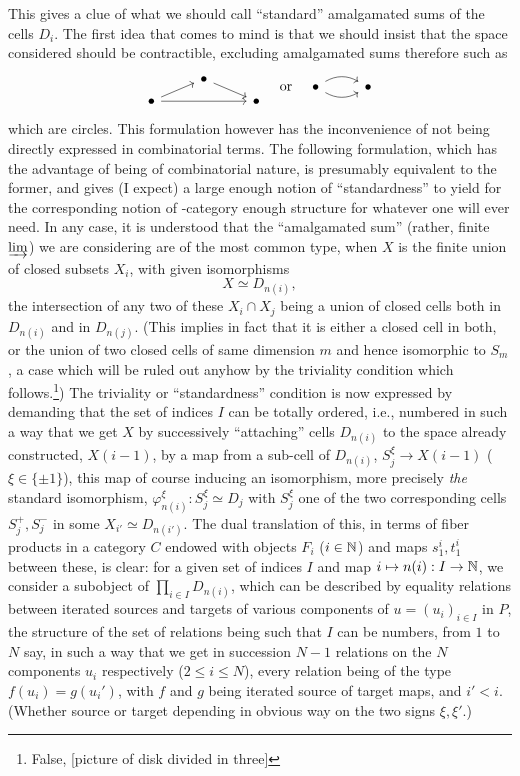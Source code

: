 This gives a clue of what we should call ``standard'' amalgamated sums
of the cells $D_i$. The first idea that comes to mind is that we
should insist that the space considered should be contractible,
excluding amalgamated sums therefore such as
\[
\begin{tikzcd}[row sep=tiny]
  & \bullet \ar[dr] \\ \bullet \ar[ur] \ar[rr] & & \bullet
\end{tikzcd} \quad\text{or}\quad
\begin{tikzcd}
  \bullet \ar[r, bend left] \ar[r, bend right] & \bullet
\end{tikzcd}\]
which are circles. This formulation however has the inconvenience of
not being directly expressed in combinatorial terms. The following
formulation, which has the advantage of being of combinatorial nature,
is presumably equivalent to the former, and gives (I expect) a large
enough notion of ``standardness'' to yield for the corresponding
notion of \oo-category enough structure for whatever one will ever
need. In any case, it is understood that the ``amalgamated
sum'' (rather, finite $\varinjlim$) we are considering are of the most
common type, when $X$ is the finite union of closed subsets $X_i$,
with given isomorphisms
\[ X \simeq D_{n(i)},\]
the intersection of any two of these $X_i\cap X_j$ being a union of
closed cells both in $D_{n(i)}$ and in $D_{n(j)}$. (This implies in
fact that it is either a closed cell in both, or the union of two
closed cells of same dimension $m$ and hence isomorphic to $S_m$, a
case which will be ruled out anyhow by the triviality condition which
follows.\footnote{False, [picture of disk divided in three]}) The
triviality or ``standardness'' condition is now expressed by demanding
that the set of indices $I$ can be totally ordered, i.e., numbered in
such a way that we get $X$ by successively ``attaching'' cells
$D_{n(i)}$ to the space already constructed, $X(i-1)$, by a map from a
sub-cell of $D_{n(i)}$, $S_j^\xi \to X(i-1)$ ($\xi\in\{\pm1\}$), this
map of course inducing an isomorphism, more precisely \emph{the}
standard isomorphism, $\varphi_{n(i)}^\xi : S_j^\xi \simeq D_j$ with
$S_j^\xi$ one of the two corresponding cells $S_j^+, S_j^-$ in some
$X_{i'}\simeq D_{n(i')}$. The dual translation of this, in terms of
fiber products in a category $C$ endowed with objects $F_i$
($i\in{\ensuremath{\mathbb{N}}}$) and maps $s_1^i,t_1^i$ between these, is clear: for a
given set of indices $I$ and map $i\mapsto n(i) : I \to {\ensuremath{\mathbb{N}}}$, we
consider a subobject of $\prod_{i\in I} D_{n(i)}$, which can be
described by equality relations between iterated sources and targets
of various components of $u=(u_i)_{i\in I}$ in $P$, the structure of
the set of relations being such that $I$ can be numbers, from $1$ to
$N$ say, in such a way that we get in succession $N-1$ relations on
the $N$ components $u_i$ respectively ($2\le i\le N$), every relation
being of the type $f(u_i) = g(u_i')$, with $f$ and $g$ being iterated
source of target maps, and $i'<i$. (Whether source or target depending
in obvious way on the two signs $\xi,\xi'$.)

